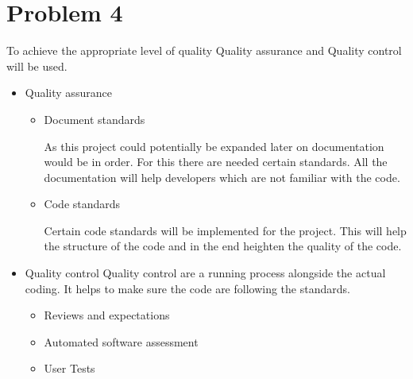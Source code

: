 \chapter{Problem 4}
To achieve the appropriate level of quality Quality assurance and Quality control will be used.
\begin{itemize}
	\setlength\itemsep{0.1em}
	\item Quality assurance
	\begin{itemize}
		\item Document standards
		
			As this project could potentially be expanded later on documentation would be in order. For this there are needed certain standards. All the documentation will help developers which are not familiar with the code.  
		\item Code standards
		
			Certain code standards will be implemented for the project. This will help the structure of the code and in the end heighten the quality of the code. 
	\end{itemize}
	\item Quality control
		Quality control are a running process alongside the actual coding. It helps to make sure the code are following the standards.
		
	\begin{itemize}
		\item Reviews and expectations
		\item Automated software assessment
		\item User Tests
	\end{itemize}
\end{itemize}